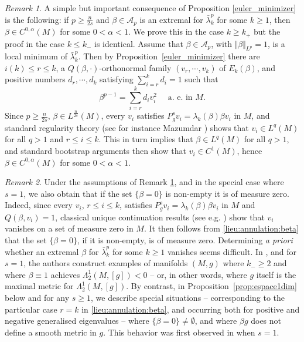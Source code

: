 \documentclass[10pt]{amsart}
\numberwithin{equation}{section}
\theoremstyle{plain}
\theoremstyle{remark}
\newtheorem{rem}{Remark}[section]
\begin{document}
\begin{rem} \label{rem:continuite}
A simple but important consequence of Proposition \ref{euler_minimizer} is the following: if $p \ge \frac{n}{2s}$ and $\beta \in \mathcal{A}_{p}$ is an extremal for  $\bar{\lambda}_k^p$ for some $k \ge 1$, then $\beta \in C^{0,\alpha}(M)$ for some $0 < \alpha < 1$. We prove this in the case $k \ge k_+$ but the proof in the case $k \le k_-$ is identical. Assume that $\beta \in \mathcal{A}_p$, with $\Vert \beta \Vert_{L^p} = 1$, is a local minimum of $\bar{\lambda}_k^p$. Then by Proposition~\ref{euler_minimizer} there are $i(k) \le r \leq k$, a $Q(\beta,\cdot)$-orthonormal family $(v_{r},\cdots,v_k)$ of $E_k(\beta)$, and positive numbers $d_r,\cdots,d_k$ satisfying $\sum_{i=r}^k d_i = 1$ such that 
\begin{equation}  \label{lieu:annulation:beta} 
  \beta^{p-1} = \sum_{i=r}^k d_i v_i^2 \quad \text{ a. e. in } M.
  \end{equation}
Since $p \ge \frac{n}{2s}$, $\beta \in L^{\frac{n}{2s}}(M)$, every $v_i$ satisfies $P_g^s v_i = \lambda_k(\beta) \beta v_i$ in $M$, and standard regularity theory (see for instance Mazumdar \cite[Theorem 5]{Mazumdar1}) shows that $v_i \in L^q(M)$ for all $q >1$ and $r \le i \le k$. This in turn implies that $\beta  \in L^q(M)$ for all $q >1$, and standard bootstrap arguments then show that $v_i \in C^1(M)$, hence $\beta \in C^{0,\alpha}(M)$ for some $0 < \alpha < 1$. 
\end{rem}

\begin{rem}
Under the assumptions of Remark \ref{rem:continuite}, and in the special case where $s=1$, we also obtain that if the set $\{\beta = 0\}$ is non-empty it is of measure zero. Indeed, since every $v_i$, $r  \le i \le k$, satisfies $P_g^s v_i = \lambda_k(\beta) \beta v_i$ in $M$ and $Q(\beta, v_i) = 1$, classical unique continuation results (see e.g. \cite[Theorem 1.7]{HardtSimon}) show that $v_i$ vanishes on a set of measure zero in $M$. It then follows from \eqref{lieu:annulation:beta} that the set $\{\beta=0\}$, if it is non-empty, is of measure zero. Determining \emph{a priori} whether an extremal $\beta$ for  $\bar{\lambda}_k^p$ for some $k \ge 1$ vanishes seems difficult. In \cite[Theorem 1.3]{GurskyPerez}, and for $s=1$, the authors construct examples of manifolds $(M,g)$ where $k_- \ge 2$ and where $\beta \equiv 1$ achieves $\Lambda_2^1(M,[g]) <0$ -- or, in other words, where $g$ itself is the maximal metric for $\Lambda_2^1(M,[g])$. By contrast, in Proposition~\ref{prop:espace1dim} below and for any $s \ge 1$, we describe special situations -- corresponding to the particular case $r=k$ in \eqref{lieu:annulation:beta}, and occurring both for positive and negative generalised eigenvalues -- where $\{\beta = 0\} \neq \emptyset$, and where $\beta g$ does not define a smooth metric in $g$. This behavior was first observed in \cite{AmmannHumbert} when $s=1$. 
\end{rem}
\end{document}
